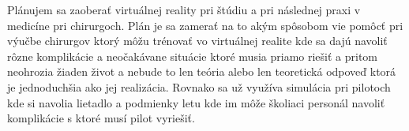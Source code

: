 Plánujem sa zaoberať virtuálnej reality pri štúdiu a pri následnej praxi v medicíne pri chirurgoch. Plán je sa zamerať na to akým spôsobom vie pomôcť pri výučbe chirurgov ktorý môžu trénovať vo virtuálnej realite kde sa dajú navoliť rôzne komplikácie a neočakávane situácie ktoré musia priamo riešiť a pritom neohrozia žiaden život a nebude to len teória alebo len teoretická odpoveď ktorá je jednoduchšia ako jej realizácia. Rovnako sa už využíva simulácia pri pilotoch kde si navolia lietadlo a podmienky letu kde im môže školiaci personál navoliť komplikácie s ktoré musí pilot vyriešiť.